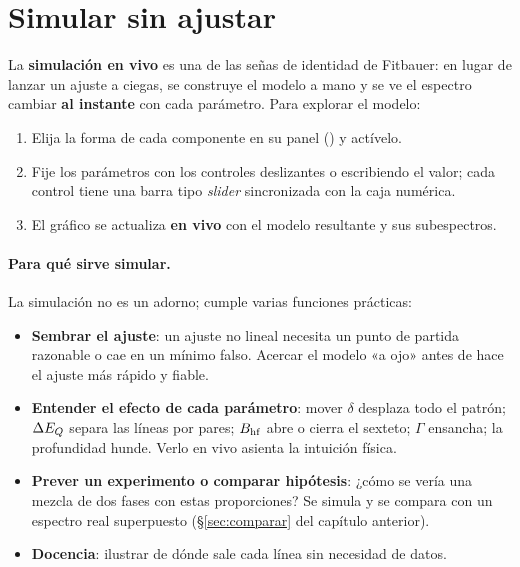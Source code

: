 \section{Simular sin ajustar}

La \textbf{simulación en vivo} es una de las señas de identidad de Fitbauer: en
lugar de lanzar un ajuste a ciegas, se construye el modelo a mano y se ve el
espectro cambiar \textbf{al instante} con cada parámetro. Para explorar el
modelo:

\begin{enumerate}[nosep]
  \item Elija la forma de cada componente en su panel () y actívelo.
  \item Fije los parámetros con los controles deslizantes o escribiendo el valor;
        cada control tiene una barra tipo \emph{slider} sincronizada con la caja
        numérica.
  \item El gráfico se actualiza \textbf{en vivo} con el modelo resultante y sus
        subespectros.
\end{enumerate}

\paragraph{Para qué sirve simular.} La simulación no es un adorno; cumple varias
funciones prácticas:

\begin{itemize}[nosep]
  \item \textbf{Sembrar el ajuste}: un ajuste no lineal necesita un punto de
        partida razonable o cae en un mínimo falso. Acercar el modelo «a ojo»
        antes de  hace el ajuste más rápido y fiable.
  \item \textbf{Entender el efecto de cada parámetro}: mover $\delta$ desplaza
        todo el patrón; $\Delta E_{Q}$ separa las líneas por pares; $B_{\mathrm{hf}}$ abre o cierra
        el sexteto; $\Gamma$ ensancha; la profundidad hunde. Verlo en vivo asienta
        la intuición física.
  \item \textbf{Prever un experimento o comparar hipótesis}: ¿cómo se vería una
        mezcla de dos fases con estas proporciones? Se simula y se compara con un
        espectro real superpuesto (§\ref{sec:comparar} del capítulo anterior).
  \item \textbf{Docencia}: ilustrar de dónde sale cada línea sin necesidad de
        datos.
\end{itemize}

